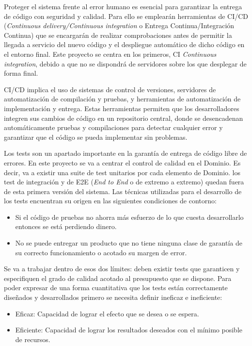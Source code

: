 
Proteger el sistema frente al error humano es esencial para garantizar la entrega de código con seguridad y calidad.
Para ello se emplearán herramientas de \gls{CI/CD} (\textit{Continuous delivery/Continuous integration} o Entrega Continua/Integración Continua) que se encargarán de realizar comprobaciones antes de permitir la llegada a servicio del nuevo código y el despliegue automático de dicho código en el entorno final.
Este proyecto se centra en los primeros, CI \textit{Continuous integration}, debido a que no se dispondrá de servidores sobre los que desplegar de forma final.

CI/CD implica el uso de sistemas de control de versiones, servidores de automatización de compilación y pruebas, y herramientas de automatización de implementación y entrega.
Estas herramientas permiten que los desarrolladores integren sus cambios de código en un repositorio central, donde se desencadenan automáticamente pruebas y compilaciones para detectar cualquier error y garantizar que el código se pueda implementar sin problemas.

Los tests son un apartado importante en la garantía de entrega de código libre de errores.
En este proyecto se va a centrar el control de calidad en el Dominio.
Es decir, va a existir una suite de test unitarios por cada elemento de Dominio.
los test de integración y de \gls{E2E} (\textit{End to End} o de extremo a extremo) quedan fuera de esta primera versión del sistema.
Las técnicas utilizadas para el desarrollo de los tests encuentran su origen en las siguientes condiciones de contorno:

\begin{itemize}
    \item Si el código de pruebas no ahorra más esfuerzo de lo que cuesta desarrollarlo entonces se está perdiendo dinero.
    \item No se puede entregar un producto que no tiene ninguna clase de garantía de su correcto funcionamiento o acotado su margen de error.
\end{itemize}

Se va a trabajar dentro de esos dos límites: deben existir tests que garanticen y especifiquen el grado de calidad acotado al presupuesto que se dispone.
Para poder expresar de una forma cuantitativa que los tests están correctamente diseñados y desarrollados primero se necesita definir ineficaz e ineficiente:

\begin{itemize}
    \item Eficaz: Capacidad de lograr el efecto que se desea o se espera.
    \item Eficiente: Capacidad de lograr los resultados deseados con el mínimo posible de recursos.
\end{itemize}

